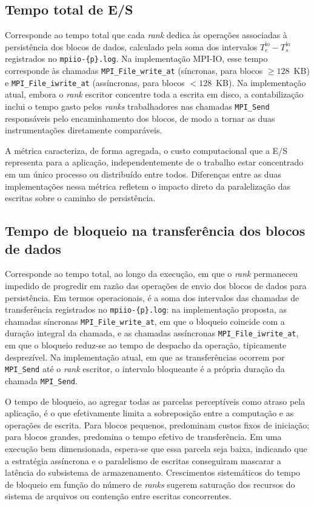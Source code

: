 \subsection{Tempo total de E/S}
\label{sec:metrica_io_total}

Corresponde ao tempo total que cada \textit{rank} dedica às operações
associadas à persistência dos blocos de dados, calculado pela soma dos
intervalos $T_e^{\text{io}} - T_s^{\text{io}}$ registrados no
\texttt{mpiio-\{p\}.log}. Na implementação MPI-IO, esse tempo
corresponde às chamadas \texttt{MPI\_File\_write\_at} (síncronas, para
blocos $\geq 128$~KB) e \texttt{MPI\_File\_iwrite\_at} (assíncronas,
para blocos $< 128$~KB). Na implementação atual, embora o
\textit{rank} escritor concentre toda a escrita em disco, a contabilização
inclui o tempo gasto pelos \textit{ranks} trabalhadores nas chamadas
\texttt{MPI\_Send} responsáveis pelo encaminhamento dos blocos, de modo
a tornar as duas instrumentações diretamente comparáveis.

A métrica caracteriza, de forma agregada, o custo computacional que a
E/S representa para a aplicação, independentemente de o trabalho estar
concentrado em um único processo ou distribuído entre todos. Diferenças
entre as duas implementações nessa métrica refletem o impacto direto da
paralelização das escritas sobre o caminho de persistência.

\subsection{Tempo de bloqueio na transferência dos blocos de dados}
\label{sec:metrica_bloqueio}

Corresponde ao tempo total, ao longo da execução, em que o
\textit{rank} permaneceu impedido de progredir em razão das
operações de envio dos blocos de dados para persistência. Em termos
operacionais, é a soma dos intervalos das chamadas de transferência
registrados no \texttt{mpiio-\{p\}.log}: na implementação proposta,
as chamadas síncronas \texttt{MPI\_File\_write\_at}, em que o
bloqueio coincide com a duração integral da chamada, e as chamadas
assíncronas \texttt{MPI\_File\_iwrite\_at}, em que o bloqueio
reduz-se ao tempo de despacho da operação, tipicamente desprezível.
Na implementação atual, em que as transferências ocorrem por
\texttt{MPI\_Send} até o \textit{rank} escritor, o intervalo
bloqueante é a própria duração da chamada \texttt{MPI\_Send}.

O tempo de bloqueio, ao agregar todas as parcelas perceptíveis como
atraso pela aplicação, é o que efetivamente limita a sobreposição
entre a computação e as operações de escrita. Para blocos pequenos,
predominam custos fixos de iniciação; para blocos grandes, predomina
o tempo efetivo de transferência. Em uma execução bem dimensionada,
espera-se que essa parcela seja baixa, indicando que a estratégia
assíncrona e o paralelismo de escritas conseguiram mascarar a
latência do subsistema de armazenamento. Crescimentos sistemáticos
do tempo de bloqueio em função do número de \textit{ranks} sugerem
saturação dos recursos do sistema de arquivos ou contenção entre
escritas concorrentes.

